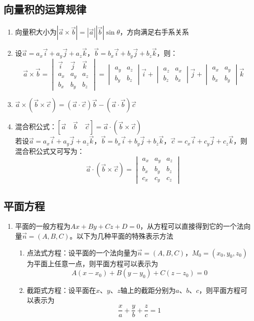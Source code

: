 \documentclass[12pt,a4paper,UTF8]{book}
\begin{document}
\subsection{向量积的运算规律}
\begin{enumerate}
\item 向量积大小为$\left|\vec{a}\times\vec{b}\right|=\left|\vec{a}\right|\left|\vec{b}\right|\sin\theta$，方向满足右手系关系
\item 设$\vec{a}=a_x\vec{i}+a_y\vec{j}+a_z\vec{k}$，$\vec{b}=b_x\vec{i}+b_y\vec{j}+b_z\vec{k}$，则：
\[\vec{a}\times\vec{b}=\begin{vmatrix}\vec{i}&\vec{j}&\vec{k}\\a_x&a_y&a_z\\b_x&b_y&b_z\end{vmatrix}=\begin{vmatrix}a_y&a_z\\b_y&b_z\end{vmatrix}\vec{i}+\begin{vmatrix}a_z&a_x\\b_z&b_x\end{vmatrix}\vec{j}+\begin{vmatrix}a_x&a_y\\b_x&b_y\end{vmatrix}\vec{k}\]
\item $\vec{a}\times\left(\vec{b}\times\vec{c}\right)=\left(\vec{a}\cdot\vec{c}\right)\vec{b}-\left(\vec{a}\cdot\vec{b}\right)\vec{c}$
\item 混合积公式：$\left[\vec{a}\quad\vec{b}\quad\vec{c}\right]=\vec{a}\cdot\left(\vec{b}\times\vec{c}\right)$\\
若设$\vec{a}=a_x\vec{i}+a_y\vec{j}+a_z\vec{k}$，$\vec{b}=b_x\vec{i}+b_y\vec{j}+b_z\vec{k}$，$\vec{c}=c_x\vec{i}+c_y\vec{j}+c_z\vec{k}$，则混合积公式又可写为：
\[\vec{a}\cdot\left(\vec{b}\times\vec{c}\right)=\begin{vmatrix}a_x&a_y&a_z\\b_x&b_y&b_z\\c_x&c_y&c_z\end{vmatrix}\]
\end{enumerate}

\subsection{平面方程}
\begin{enumerate}
\item 平面的一般方程为$Ax+By+Cz+D=0$，从方程可以直接得到它的一个法向量$\vec{n}=\left(A,B,C\right)$。以下为几种平面的特殊表示方法
\begin{enumerate}
\item 点法式方程：设平面的一个法向量为$\vec{n}=\left(A,B,C\right)$，$M_0=\left(x_0,y_0,z_0\right)$为平面上任意一点，则平面方程可以表示为
\[A\left(x-x_0\right)+B\left(y-y_0\right)+C\left(z-z_0\right)=0\]
\item 截距式方程：设平面在$x$、$y$、$z$轴上的截距分别为$a$、$b$、$c$，则平面方程可以表示为
\[\frac{x}{a}+\frac{y}{b}+\frac{z}{c}=1\]
\end{enumerate}
\end{enumerate}
\end{document}

